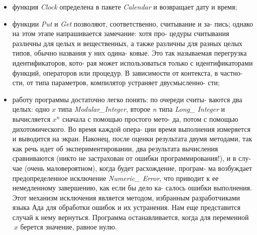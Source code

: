\begin{itemize}
\item функция {\it Clock} определена в пакете {\it Calendar} и возвращает дату и\linebreak
время;
\item функции {\it Put} и {\it Get} позволяют, соответственно, считывание и за­-\linebreak
пись; однако на этом этапе напрашивается замечание: хотя про­-\linebreak
цедуры считывания различны для целых и вещественных, а также\linebreak
различны для разных целых типов, обычно названия у них одина­-\linebreak
ковые. Это так называемая перегрузка идентификаторов, кото­-\linebreak
рая может использоваться только с идентификаторами функций,\linebreak
операторов или процедур. В зависимости от контекста, в частно­-\linebreak
сти, от типа параметров, компилятор устраняет двусмысленно­-\linebreak
сти;
\item работу программы достаточно легко понять: по очереди считы­-\linebreak
ваются два целых: одно $x$ типа {\it Modular\_Integer}, второе {\it n} типа\linebreak
{\it Long\_ Integer} и вычисляется  $x^n$ сначала с помощью простого мето­-\linebreak
да, потом с помощью дихотомического. Во время каждой опера­-\linebreak
ции время выполнения измеряется и выводится на экран. Наконец,\linebreak
после оценки результата двумя методами, так как речь идет об\linebreak
экспериментировании, два результата вычисления сравниваются\linebreak
(никто не застрахован от ошибки программирования!), и в слу­-\linebreak
чае (очень маловероятном), когда будет расхождение, програм­-\linebreak
ма возбуждает предопределенное исключение {\it Numeric\_ Error}, что\linebreak
приводит к ее немедленному завершению, как если бы дело ка­-\linebreak
салось ошибки выполнения. Этот механизм исключения является\linebreak
методом, избранным разработчиками языка Ада для обработки\linebreak
ошибок и их устранения. Нам еще представится случай к нему\linebreak
вернуться. Программа останавливается, когда для переменной $\ x$\linebreak
берется значение, равное нулю.
\end{itemize}
\newpage


